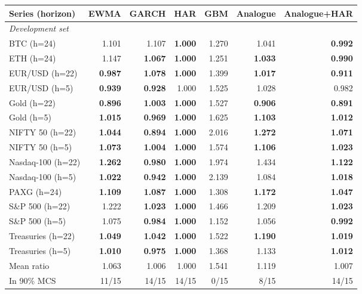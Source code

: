 \begin{tabular}{lrrrrrr}
\toprule
Series (horizon) & EWMA & GARCH & HAR & GBM & Analogue & Analogue+HAR \\
\midrule
\multicolumn{7}{l}{\textit{Development set}}\\
BTC (h=24) & 1.101 & 1.107 & \textbf{1.000} & 1.270 & 1.041 & \textbf{0.992}\\
ETH (h=24) & 1.147 & \textbf{1.067} & \textbf{1.000} & 1.251 & \textbf{1.033} & \textbf{0.990}\\
EUR/USD (h=22) & \textbf{0.987} & \textbf{1.078} & \textbf{1.000} & 1.399 & \textbf{1.017} & \textbf{0.911}\\
EUR/USD (h=5) & \textbf{0.939} & \textbf{0.928} & 1.000 & 1.525 & 1.028 & 0.982\\
Gold (h=22) & \textbf{0.896} & \textbf{1.003} & \textbf{1.000} & 1.527 & \textbf{0.906} & \textbf{0.891}\\
Gold (h=5) & \textbf{1.015} & \textbf{0.969} & \textbf{1.000} & 1.625 & \textbf{1.103} & \textbf{1.012}\\
NIFTY 50 (h=22) & \textbf{1.044} & \textbf{0.894} & \textbf{1.000} & 2.016 & \textbf{1.272} & \textbf{1.071}\\
NIFTY 50 (h=5) & \textbf{1.073} & \textbf{1.004} & \textbf{1.000} & 1.574 & \textbf{1.106} & \textbf{1.023}\\
Nasdaq-100 (h=22) & \textbf{1.262} & \textbf{0.980} & \textbf{1.000} & 1.974 & 1.434 & \textbf{1.122}\\
Nasdaq-100 (h=5) & \textbf{1.022} & \textbf{0.942} & \textbf{1.000} & 2.139 & 1.084 & \textbf{1.018}\\
PAXG (h=24) & \textbf{1.109} & \textbf{1.087} & \textbf{1.000} & 1.308 & \textbf{1.172} & \textbf{1.047}\\
S\&P 500 (h=22) & 1.222 & \textbf{1.023} & \textbf{1.000} & 1.466 & 1.209 & \textbf{1.023}\\
S\&P 500 (h=5) & 1.075 & \textbf{0.984} & \textbf{1.000} & 1.152 & 1.056 & \textbf{0.992}\\
Treasuries (h=22) & \textbf{1.049} & \textbf{1.042} & \textbf{1.000} & 1.522 & \textbf{1.190} & \textbf{1.019}\\
Treasuries (h=5) & \textbf{1.010} & \textbf{0.975} & \textbf{1.000} & 1.368 & 1.133 & \textbf{1.012}\\
\addlinespace Mean ratio & 1.063 & 1.006 & 1.000 & 1.541 & 1.119 & 1.007\\
In 90\% MCS & 11/15 & 14/15 & 14/15 & 0/15 & 8/15 & 14/15\\

\end{tabular}
